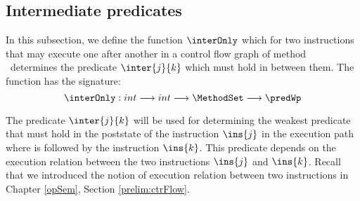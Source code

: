 
\subsection{Intermediate predicates} \label{wp:interPred}
In this subsection, we define the function $\interOnly$ which for two instructions that may execute one
after another in a control flow graph  of  method \methodd \ determines the predicate $\inter{j}{k}$ which must hold in between them.
The function has the signature:
$$ \interOnly: int \longrightarrow int  \longrightarrow \MethodSet \longrightarrow \predWp $$ 


 The predicate $\inter{j}{k}$ will be used for determining the weakest predicate that must hold in the poststate of the instruction
 $\ins{j}$ in the execution path where   is followed by the instruction $\ins{k}$.
 This predicate depends on the execution relation between the two instructions $\ins{j}$ and $\ins{k}$.
 Recall that  we introduced the notion of execution  relation between two instructions  in Chapter \ref{opSem},
 Section \ref{prelim:ctrFlow}. %



